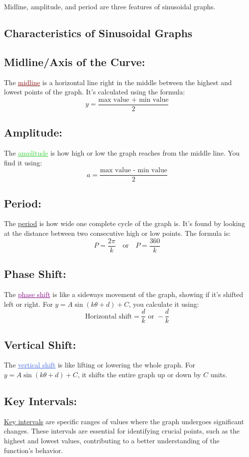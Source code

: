 \documentclass[12pt,a4paper]{article}
\begin{document}
Midline, amplitude, and period are three features of sinusoidal graphs.
\newpage
\subsection{Characteristics of Sinusoidal Graphs}
\subsection{Midline/Axis of the Curve:}
The \textcolor{Maroon}{\underline{midline}} is a horizontal line right in the middle between the highest and lowest points of the graph. It's calculated using the formula:
\[y = \frac{\text{max value + min value}}{2}\]

\subsection{Amplitude:}
The \textcolor{LimeGreen}{\underline{amplitude}} is how high or low the graph reaches from the middle line. You find it using:
\[a = \frac{\text{max value - min value}}{2}\]

\subsection{Period:}
The \textcolor{Periwinkle}{\underline{period}} is how wide one complete cycle of the graph is. It's found by looking at the distance between two consecutive high or low points. The formula is:
\[P = \frac{2\pi}{k}\quad \text{or} \quad P = \frac{360}{k} \]

\subsection{Phase Shift:}
The \textcolor{Purple}{\underline{phase shift}} is like a sideways movement of the graph, showing if it's shifted left or right. For \(y = A \sin(k \theta + d) + C\), you calculate it using:
\[\text{Horizontal shift} = \frac{d}{k} \text{ or }  -\frac{d}{k}\]

\subsection{Vertical Shift:}
The \textcolor{RoyalBlue}{\underline{vertical shift}} is like lifting or lowering the whole graph. For \(y = A \sin(k \theta + d) + C\), it shifts the entire graph up or down by \(C\) units.

\subsection{Key Intervals:}
\textcolor{OliveGreen}{\underline{Key intervals}} are specific ranges of values where the graph undergoes significant changes. These intervals are essential for identifying crucial points, such as the highest and lowest values, contributing to a better understanding of the function's behavior.
\end{document}
